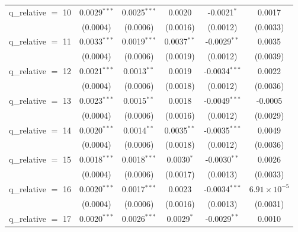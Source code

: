 \begin{tabular}{lccccc}
   q\_relative $=$ 10   & 0.0029$^{***}$  & 0.0025$^{***}$         & 0.0020            & -0.0021$^{*}$                 & 0.0017\\   
                        & (0.0004)        & (0.0006)               & (0.0016)          & (0.0012)                      & (0.0033)\\   
   q\_relative $=$ 11   & 0.0033$^{***}$  & 0.0019$^{***}$         & 0.0037$^{**}$     & -0.0029$^{**}$                & 0.0035\\   
                        & (0.0004)        & (0.0006)               & (0.0019)          & (0.0012)                      & (0.0039)\\   
   q\_relative $=$ 12   & 0.0021$^{***}$  & 0.0013$^{**}$          & 0.0019            & -0.0034$^{***}$               & 0.0022\\   
                        & (0.0004)        & (0.0006)               & (0.0018)          & (0.0012)                      & (0.0036)\\   
   q\_relative $=$ 13   & 0.0023$^{***}$  & 0.0015$^{**}$          & 0.0018            & -0.0049$^{***}$               & -0.0005\\   
                        & (0.0004)        & (0.0006)               & (0.0016)          & (0.0012)                      & (0.0029)\\   
   q\_relative $=$ 14   & 0.0020$^{***}$  & 0.0014$^{**}$          & 0.0035$^{**}$     & -0.0035$^{***}$               & 0.0049\\   
                        & (0.0004)        & (0.0006)               & (0.0018)          & (0.0012)                      & (0.0036)\\   
   q\_relative $=$ 15   & 0.0018$^{***}$  & 0.0018$^{***}$         & 0.0030$^{*}$      & -0.0030$^{**}$                & 0.0026\\   
                        & (0.0004)        & (0.0006)               & (0.0017)          & (0.0013)                      & (0.0033)\\   
   q\_relative $=$ 16   & 0.0020$^{***}$  & 0.0017$^{***}$         & 0.0023            & -0.0034$^{***}$               & $6.91\times 10^{-5}$\\    
                        & (0.0004)        & (0.0006)               & (0.0016)          & (0.0013)                      & (0.0031)\\   
   q\_relative $=$ 17   & 0.0020$^{***}$  & 0.0026$^{***}$         & 0.0029$^{*}$      & -0.0029$^{**}$                & 0.0010\\   

\end{tabular}
